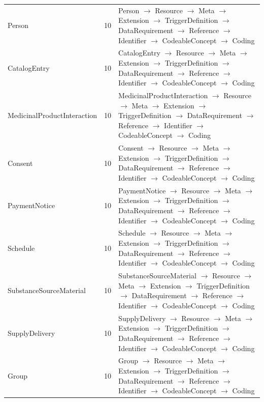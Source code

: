 \begin{longtable}{lrl}
Person & 10 & Person $\rightarrow$ Resource $\rightarrow$ Meta $\rightarrow$ Extension $\rightarrow$ TriggerDefinition $\rightarrow$ DataRequirement $\rightarrow$ Reference $\rightarrow$ Identifier $\rightarrow$ CodeableConcept $\rightarrow$ Coding \\
CatalogEntry & 10 & CatalogEntry $\rightarrow$ Resource $\rightarrow$ Meta $\rightarrow$ Extension $\rightarrow$ TriggerDefinition $\rightarrow$ DataRequirement $\rightarrow$ Reference $\rightarrow$ Identifier $\rightarrow$ CodeableConcept $\rightarrow$ Coding \\
MedicinalProductInteraction & 10 & MedicinalProductInteraction $\rightarrow$ Resource $\rightarrow$ Meta $\rightarrow$ Extension $\rightarrow$ TriggerDefinition $\rightarrow$ DataRequirement $\rightarrow$ Reference $\rightarrow$ Identifier $\rightarrow$ CodeableConcept $\rightarrow$ Coding \\
Consent & 10 & Consent $\rightarrow$ Resource $\rightarrow$ Meta $\rightarrow$ Extension $\rightarrow$ TriggerDefinition $\rightarrow$ DataRequirement $\rightarrow$ Reference $\rightarrow$ Identifier $\rightarrow$ CodeableConcept $\rightarrow$ Coding \\
PaymentNotice & 10 & PaymentNotice $\rightarrow$ Resource $\rightarrow$ Meta $\rightarrow$ Extension $\rightarrow$ TriggerDefinition $\rightarrow$ DataRequirement $\rightarrow$ Reference $\rightarrow$ Identifier $\rightarrow$ CodeableConcept $\rightarrow$ Coding \\
Schedule & 10 & Schedule $\rightarrow$ Resource $\rightarrow$ Meta $\rightarrow$ Extension $\rightarrow$ TriggerDefinition $\rightarrow$ DataRequirement $\rightarrow$ Reference $\rightarrow$ Identifier $\rightarrow$ CodeableConcept $\rightarrow$ Coding \\
SubstanceSourceMaterial & 10 & SubstanceSourceMaterial $\rightarrow$ Resource $\rightarrow$ Meta $\rightarrow$ Extension $\rightarrow$ TriggerDefinition $\rightarrow$ DataRequirement $\rightarrow$ Reference $\rightarrow$ Identifier $\rightarrow$ CodeableConcept $\rightarrow$ Coding \\
SupplyDelivery & 10 & SupplyDelivery $\rightarrow$ Resource $\rightarrow$ Meta $\rightarrow$ Extension $\rightarrow$ TriggerDefinition $\rightarrow$ DataRequirement $\rightarrow$ Reference $\rightarrow$ Identifier $\rightarrow$ CodeableConcept $\rightarrow$ Coding \\
Group & 10 & Group $\rightarrow$ Resource $\rightarrow$ Meta $\rightarrow$ Extension $\rightarrow$ TriggerDefinition $\rightarrow$ DataRequirement $\rightarrow$ Reference $\rightarrow$ Identifier $\rightarrow$ CodeableConcept $\rightarrow$ Coding \\

\end{longtable}
